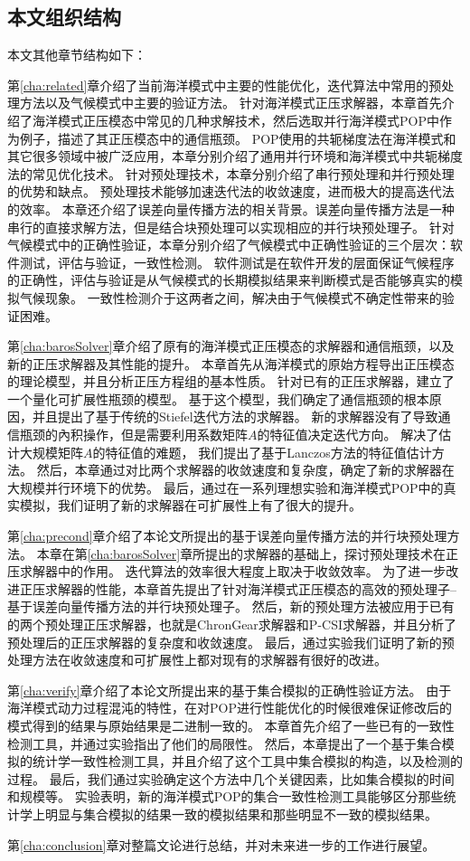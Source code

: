 \subsection{本文组织结构}
本文其他章节结构如下：

第\ref{cha:related}章介绍了当前海洋模式中主要的性能优化，迭代算法中常用的预处理方法以及气候模式中主要的验证方法。
针对海洋模式正压求解器，本章首先介绍了海洋模式正压模态中常见的几种求解技术，然后选取并行海洋模式POP中作为例子，描述了其正压模态中的通信瓶颈。 
POP使用的共轭梯度法在海洋模式和其它很多领域中被广泛应用，本章分别介绍了通用并行环境和海洋模式中共轭梯度法的常见优化技术。
针对预处理技术，本章分别介绍了串行预处理和并行预处理的优势和缺点。
预处理技术能够加速迭代法的收敛速度，进而极大的提高迭代法的效率。
本章还介绍了误差向量传播方法的相关背景。误差向量传播方法是一种串行的直接求解方法，但是结合块预处理可以实现相应的并行块预处理子。
针对气候模式中的正确性验证，本章分别介绍了气候模式中正确性验证的三个层次：软件测试，评估与验证，一致性检测。
软件测试是在软件开发的层面保证气候程序的正确性，评估与验证是从气候模式的长期模拟结果来判断模式是否能够真实的模拟气候现象。
一致性检测介于这两者之间，解决由于气候模式不确定性带来的验证困难。


第\ref{cha:barosSolver}章介绍了原有的海洋模式正压模态的求解器和通信瓶颈，以及新的正压求解器及其性能的提升。 
本章首先从海洋模式的原始方程导出正压模态的理论模型，并且分析正压方程组的基本性质。
针对已有的正压求解器，建立了一个量化可扩展性瓶颈的模型。
基于这个模型，我们确定了通信瓶颈的根本原因，并且提出了基于传统的Stiefel迭代方法的求解器。 
新的求解器没有了导致通信瓶颈的內积操作，但是需要利用系数矩阵$A$的特征值决定迭代方向。 
解决了估计大规模矩阵$A$的特征值的难题， 我们提出了基于Lanczos方法的特征值估计方法。 
然后，本章通过对比两个求解器的收敛速度和复杂度，确定了新的求解器在大规模并行环境下的优势。
最后，通过在一系列理想实验和海洋模式POP中的真实模拟，我们证明了新的求解器在可扩展性上有了很大的提升。 



第\ref{cha:precond}章介绍了本论文所提出的基于误差向量传播方法的并行块预处理方法。
本章在第\ref{cha:barosSolver}章所提出的求解器的基础上，探讨预处理技术在正压求解器中的作用。
迭代算法的效率很大程度上取决于收敛效率。
为了进一步改进正压求解器的性能，本章首先提出了针对海洋模式正压模态的高效的预处理子--基于误差向量传播方法的并行块预处理子。
然后，新的预处理方法被应用于已有的两个预处理正压求解器，也就是ChronGear求解器和P-CSI求解器，并且分析了预处理后的正压求解器的复杂度和收敛速度。
最后，通过实验我们证明了新的预处理方法在收敛速度和可扩展性上都对现有的求解器有很好的改进。

第\ref{cha:verify}章介绍了本论文所提出来的基于集合模拟的正确性验证方法。  
由于海洋模式动力过程混沌的特性，在对POP进行性能优化的时候很难保证修改后的模式得到的结果与原始结果是二进制一致的。 
本章首先介绍了一些已有的一致性检测工具，并通过实验指出了他们的局限性。
然后，本章提出了一个基于集合模拟的统计学一致性检测工具，并且介绍了这个工具中集合模拟的构造，以及检测的过程。
最后，我们通过实验确定这个方法中几个关键因素，比如集合模拟的时间和规模等。
实验表明，新的海洋模式POP的集合一致性检测工具能够区分那些统计学上明显与集合模拟的结果一致的模拟结果和那些明显不一致的模拟结果。 


第\ref{cha:conclusion}章对整篇文论进行总结，并对未来进一步的工作进行展望。


